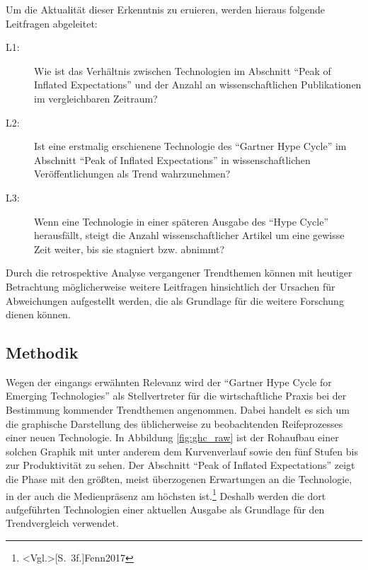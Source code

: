 Um die Aktualität dieser Erkenntnis zu eruieren, werden hieraus folgende Leitfragen abgeleitet:

\begin{description}
	\item[L1:] Wie ist das Verhältnis zwischen Technologien im Abschnitt "`Peak of Inflated Expectations"' und der Anzahl an wissenschaftlichen Publikationen im vergleichbaren Zeitraum?
\end{description}

\begin{description}
	\item[L2:] Ist eine erstmalig erschienene Technologie des "`Gartner Hype Cycle"' im Ab\-schnitt "`Peak of Inflated Expectations"' in wissen\-schaftlichen Ver\-öf\-fent\-lichungen als Trend wahrzunehmen?
\end{description}

\begin{description}
	\item[L3:] Wenn eine Technologie in einer späteren Ausgabe des "`Hype Cycle"' herausfällt, steigt die Anzahl wissenschaftlicher Artikel um eine gewisse Zeit weiter, bis sie stagniert bzw. abnimmt?
\end{description}

Durch die retrospektive Analyse vergangener Trendthemen können mit heutiger Betrachtung möglicherweise weitere Leitfragen hinsichtlich der Ursachen für Abweichungen aufgestellt werden, die als Grundlage für die weitere Forschung dienen können.

\subsection{Methodik}\label{sec:method}
Wegen der eingangs erwähnten Relevanz wird der "`Gartner Hype Cycle for Emerging Technologies"' als Stellvertreter für die wirtschaftliche Praxis bei der Bestimmung kommender Trendthemen angenommen. Dabei handelt es sich um die graphische Darstellung des üblicherweise zu beobachtenden Reifeprozesses einer neuen Technologie. In Abbildung \ref{fig:ghc_raw} ist der Rohaufbau einer solchen Graphik mit unter anderem dem Kurvenverlauf sowie den fünf Stufen bis zur Produktivität zu sehen. Der Abschnitt "`Peak of Inflated Expectations"' zeigt die Phase mit den größten, meist überzogenen Erwartungen an die Technologie, in der auch die Medienpräsenz am höchsten ist.\footnote{\citeNP<Vgl.>[S.~3f.]{Fenn2017}} Deshalb werden die dort aufgeführten Technologien einer aktuellen Ausgabe als Grundlage für den Trendvergleich verwendet.

